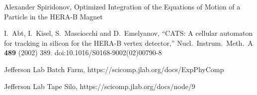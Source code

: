 \documentclass{elsart}
\begin{document}
\begin{thebibliography}{99}
Alexander Spiridonov, Optimized Integration of the Equations of Motion of a Particle in the HERA-B Magnet

  I.~Abt, I.~Kisel, S.~Masciocchi and D.~Emelyanov,
  ``CATS: A cellular automaton for tracking in silicon for the HERA-B vertex detector,''
  Nucl.\ Instrum.\ Meth.\ A {\bf 489} (2002) 389.
  doi:10.1016/S0168-9002(02)00790-8

    Jefferson Lab Batch Farm,
    https://scicomp.jlab.org/docs/ExpPhyComp

    Jefferson Lab Tape Silo,
    https://scicomp.jlab.org/docs/node/9

\end{thebibliography}
\end{document}
